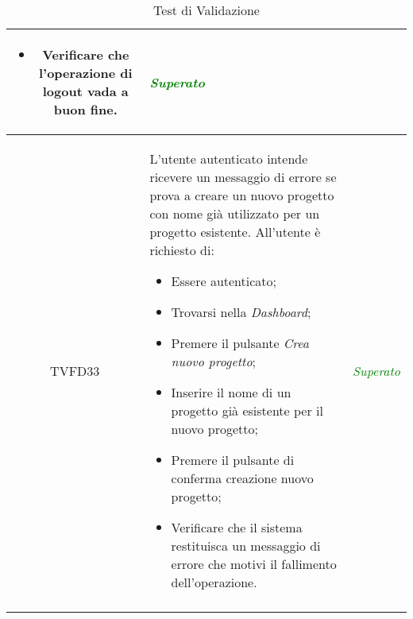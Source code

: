 \begin{longtable}{|c|>{}m{8cm}|c|}
\begin{itemize}
	\item Verificare che l'operazione di logout vada a buon fine.
\end{itemize} & \textcolor{Green}{\textit{Superato}}\\ \hline
\hypertarget{TVFD33}{TVFD33} & L'utente autenticato intende ricevere un messaggio di errore se prova a creare un nuovo progetto con nome già utilizzato per un progetto esistente.
All'utente è richiesto di:
\begin{itemize}
	\item Essere autenticato;
	\item Trovarsi nella \textit{Dashboard};
	\item Premere il pulsante \textit{Crea nuovo progetto};
	\item Inserire il nome di un progetto già esistente per il nuovo progetto;
	\item Premere il pulsante di conferma creazione nuovo progetto;
	\item Verificare che il sistema restituisca un messaggio di errore che motivi il fallimento dell'operazione.
\end{itemize} & \textcolor{Green}{\textit{Superato}}\\ \hline
\caption[Test di Validazione]{Test di Validazione}
\label{tabella:test0}
\end{longtable}
\clearpage

